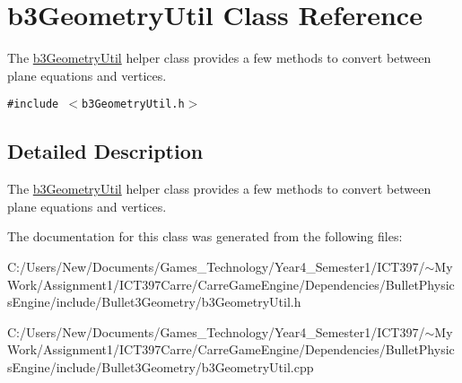 \hypertarget{classb3_geometry_util}{
\section{b3GeometryUtil Class Reference}
\label{classb3_geometry_util}
}
The \hyperlink{classb3_geometry_util}{b3GeometryUtil} helper class provides a few methods to convert between plane equations and vertices.  


{\tt \#include $<$b3GeometryUtil.h$>$}



\subsection{Detailed Description}
The \hyperlink{classb3_geometry_util}{b3GeometryUtil} helper class provides a few methods to convert between plane equations and vertices. 

The documentation for this class was generated from the following files:\begin{CompactItemize}
\item 
C:/Users/New/Documents/Games\_\-Technology/Year4\_\-Semester1/ICT397/$\sim$My Work/Assignment1/ICT397Carre/CarreGameEngine/Dependencies/BulletPhysicsEngine/include/Bullet3Geometry/b3GeometryUtil.h\item 
C:/Users/New/Documents/Games\_\-Technology/Year4\_\-Semester1/ICT397/$\sim$My Work/Assignment1/ICT397Carre/CarreGameEngine/Dependencies/BulletPhysicsEngine/include/Bullet3Geometry/b3GeometryUtil.cpp\end{CompactItemize}
